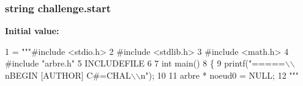\hypertarget{namespacechallenge_a33c04a2446b66a565b08a110267a4c1e}{
\subsubsection[{start}]{\setlength{\rightskip}{0pt plus 5cm}string challenge.\+start}}\label{namespacechallenge_a33c04a2446b66a565b08a110267a4c1e}
{\bfseries Initial value\+:}
\begin{DoxyCode}
1 = \textcolor{stringliteral}{"""#include <stdio.h>}
2 \textcolor{stringliteral}{#include <stdlib.h>}
3 \textcolor{stringliteral}{#include <math.h>}
4 \textcolor{stringliteral}{#include "arbre.h"}
5 \textcolor{stringliteral}{INCLUDEFILE}
6 \textcolor{stringliteral}{}
7 \textcolor{stringliteral}{int main()}
8 \textcolor{stringliteral}{\{}
9 \textcolor{stringliteral}{    printf("=====\(\backslash\)\(\backslash\)nBEGIN [AUTHOR] C#=CHAL\(\backslash\)\(\backslash\)n");}
10 \textcolor{stringliteral}{}
11 \textcolor{stringliteral}{    arbre * noeud0 = NULL;}
12 \textcolor{stringliteral}{"""}
\end{DoxyCode}
